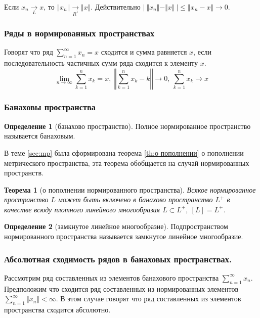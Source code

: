 \documentclass[14pt,a4paper]{extarticle}
\newtheorem{theorem}{Теорема}[section]
\theoremstyle{definition}
\newtheorem{definition}{Определение}[section]
\theoremstyle{remark}
\renewcommand{\[}{\begin{dmath*}[compact]}
\renewcommand{\]}{\end{dmath*}}
\newcommand{\ds}{\displaystyle}
\newcommand{\sep}{ , \ \allowbreak }
\begin{document}
Если $x_n \xrightarrow[L]{} x$, то $ \Vert x_n \Vert
\xrightarrow[R^1]{} \Vert x \Vert $.
Действительно ${|\ \Vert x_n \Vert - \Vert x \Vert \ |} \allowbreak
\leq {\Vert x_n - x \Vert} \to 0$.

\subsubsection{Ряды в нормированных пространствах}

Говорят что ряд $\ds\sum_{n=1}^\infty x_n = x$ сходится и сумма равняется $x$,
если последовательность частичных сумм ряда сходится к элементу $x$.
\[{\lim_{n \to \infty} \sum_{k=1}^n x_k = x} \sep
{\left \Vert \sum_{k=1}^n x_k - k \right \Vert \to 0} \sep
{\sum_{k=1}^n x_k \to x}\]

\subsubsection{Банаховы пространства}

\begin{definition}[банахово пространство]
Полное нормированное пространство называется банаховым.
\end{definition}

В теме \ref{sec:mp} была сформирована теорема \ref{th:о пополнении}
о пополнении метрического пространства,
эта теорема обобщается на случай нормированных пространств.

\begin{theorem}[о пополнении нормированного пространства]
\label{th:о пополнении нормированного пространства}
  Всякое нормированное пространство $L$ может быть включено в банахово
  пространство $L^+$ в качестве всюду плотного линейного многообразия
  $L \subset L^+ \sep [L]=L^+$.
\end{theorem}

\begin{definition}[замкнутое линейное многообразие]
  Подпространством нормированного пространства называется
  замкнутое линейное многообразие.
\end{definition}

\subsubsection{Абсолютная сходимость рядов в банаховых пространствах.}

Рассмотрим ряд составленных из элементов банахового пространства
$\ds\sum_{n=1}^\infty x_n$.
Предположим что сходится ряд составленных из нормированных элементов
$\ds\sum_{n=1}^\infty \Vert x_n \Vert < \infty$.
В этом случае говорят что ряд составленных из элементов пространства
сходится абсолютно.
\end{document}
